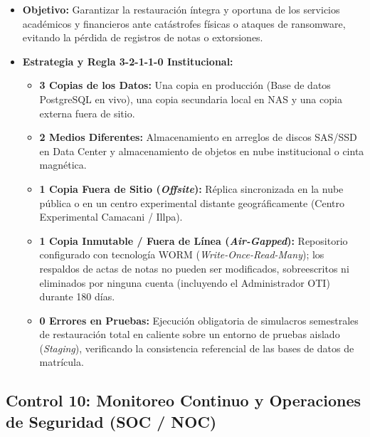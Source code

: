 \begin{itemize}
    \item \textbf{Objetivo:} Garantizar la restauración íntegra y oportuna de los servicios académicos y financieros ante catástrofes físicas o ataques de ransomware, evitando la pérdida de registros de notas o extorsiones.
    \item \textbf{Estrategia y Regla 3-2-1-1-0 Institucional:}
    \begin{itemize}
        \item \textbf{3 Copias de los Datos:} Una copia en producción (Base de datos PostgreSQL en vivo), una copia secundaria local en NAS y una copia externa fuera de sitio.
        \item \textbf{2 Medios Diferentes:} Almacenamiento en arreglos de discos SAS/SSD en Data Center y almacenamiento de objetos en nube institucional o cinta magnética.
        \item \textbf{1 Copia Fuera de Sitio (\textit{Offsite}):} Réplica sincronizada en la nube pública o en un centro experimental distante geográficamente (Centro Experimental Camacani / Illpa).
        \item \textbf{1 Copia Inmutable / Fuera de Línea (\textit{Air-Gapped}):} Repositorio configurado con tecnología WORM (\textit{Write-Once-Read-Many}); los respaldos de actas de notas no pueden ser modificados, sobreescritos ni eliminados por ninguna cuenta (incluyendo el Administrador OTI) durante 180 días.
        \item \textbf{0 Errores en Pruebas:} Ejecución obligatoria de simulacros semestrales de restauración total en caliente sobre un entorno de pruebas aislado (\textit{Staging}), verificando la consistencia referencial de las bases de datos de matrícula.
    \end{itemize}
\end{itemize}

\vspace{0.2cm}
\subsection{Control 10: Monitoreo Continuo y Operaciones de Seguridad (SOC / NOC)}

